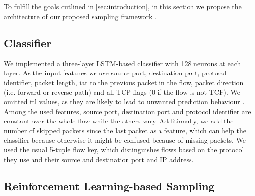 \documentclass[conference]{IEEEtran}
\begin{document}

\section{\ours{}}

To fulfill the goals outlined in \autoref{sec:introduction}, in this section we propose the architecture of our proposed sampling framework \ours.

\subsection{Classifier}
\label{subsec:classifier}
We implemented a three-layer LSTM-based classifier with 128 neurons at each layer. As the input features we use source port, destination port, protocol identifier, packet length, \gls{iat} to the previous packet in the flow, packet direction (i.e. forward or reverse path) and all TCP flags (0 if the flow is not TCP).
We omitted \gls{ttl} values, as they are likely to lead to unwanted prediction behaviour \cite{bachl_walling_2019}.  Among the used features, source port, destination port and protocol identifier are constant over the whole flow while the others vary.
Additionally, we add the number of skipped packets since the last packet as a feature, which can help the classifier because otherwise it might be confused because of missing packets.
We used the usual 5-tuple flow key, which distinguishes flows based on the protocol they use and their source and destination port and IP address.

\subsection{Reinforcement Learning-based Sampling}
\label{subsec:rlForSampling}
\end{document}
